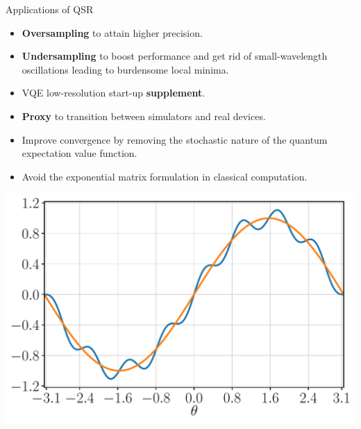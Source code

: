 \begin{frame}{Applications of QSR}

  \begin{multicols}{2}
    \begin{itemize}
      \item \textbf{Oversampling} to attain higher precision.
      \item \textbf{Undersampling} to boost performance and get rid of small-wavelength oscillations leading to burdensome local minima.
      \item VQE low-resolution start-up \textbf{supplement}.
      \item \textbf{Proxy} to transition between simulators and real devices.
      \item Improve convergence by removing the stochastic nature of the quantum expectation value function.
      \item Avoid the exponential matrix formulation in classical computation.
    \end{itemize}

    \columnbreak

    \begin{center}
      \includegraphics[width=.40\paperwidth]{Figures/low-resolution}
    \end{center}

  \end{multicols}

\end{frame}
